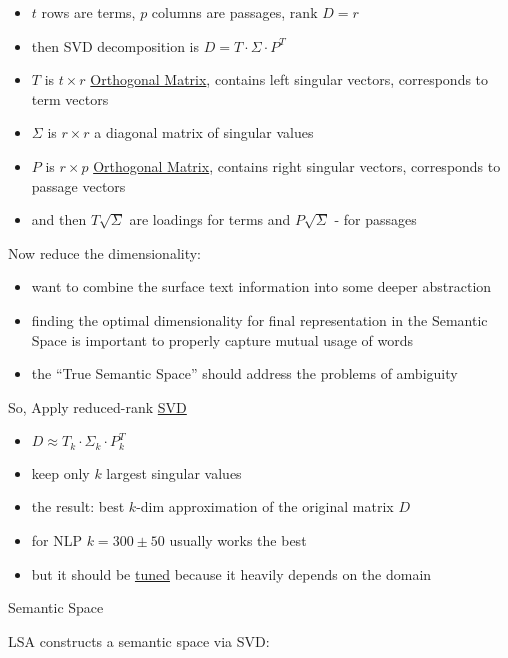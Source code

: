 \begin{itemize}
\itemsep1pt\parskip0pt
\item
  $t$ rows are terms, $p$ columns are passages,
  $\text{rank } D = r$
\item
  then SVD decomposition is $D = T \cdot
  \Sigma \cdot P^T$
\item
  $T$ is $t \times r$
  \href{Orthogonal Matrix}{Orthogonal Matrix}, contains left singular
  vectors, corresponds to term vectors
\item
  $\Sigma$ is $r \times r$ a diagonal
  matrix of singular values
\item
  $P$ is $r \times p$
  \href{Orthogonal Matrix}{Orthogonal Matrix}, contains right singular
  vectors, corresponds to passage vectors
\item
  and then $T \sqrt\Sigma$ are loadings
  for terms and $P \sqrt\Sigma$ - for
  passages
\end{itemize}

Now reduce the dimensionality:

\begin{itemize}
\itemsep1pt\parskip0pt
\item
  want to combine the surface text information into some deeper
  abstraction
\item
  finding the optimal dimensionality for final representation in the
  Semantic Space is important to properly capture mutual usage of words
\item
  the ``True Semantic Space'' should address the problems of ambiguity
\end{itemize}

So, Apply reduced-rank \url{SVD}

\begin{itemize}
\itemsep1pt\parskip0pt
\item
  $D \approx T_k \cdot
  \Sigma_k \cdot P^T_k$
\item
  keep only $k$ largest singular values
\item
  the result: best $k$-dim approximation of the original matrix $D$
\item
  for NLP $k = 300 \pm 50$ usually works the best
\item
  but it should be \href{Parameter Tuning}{tuned} because it heavily
  depends on the domain
\end{itemize}

Semantic Space

LSA constructs a semantic space via SVD:

